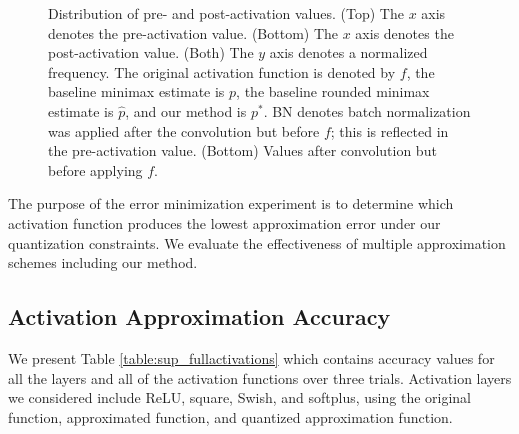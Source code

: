 \documentclass[conference]{IEEEtran}
\begin{document}
\begin{figure}[t]
{        \label{fig:hist_no_bn_fc1}
    }
    \caption{Distribution of pre- and post-activation values. (Top) The $x$ axis denotes the pre-activation value. (Bottom) The $x$ axis denotes the post-activation value. (Both) The $y$ axis denotes a normalized frequency. The original activation function is denoted by $f$, the baseline minimax estimate is $p$, the baseline rounded minimax estimate is $\hat{p}$, and our method is $p^*$. BN denotes batch normalization was applied after the convolution but before $f$; this is reflected in the pre-activation value. (Bottom) Values after convolution but before applying $f$.}
    \label{fig:hist}
\end{figure}

The purpose of the error minimization experiment is to determine which activation function produces the lowest approximation error under our quantization constraints.
We evaluate the effectiveness of multiple approximation schemes including our method.

\subsection{Activation Approximation Accuracy}
We present Table \ref{table:sup_fullactivations} which contains accuracy values for all the layers and all of the activation functions over three trials.
Activation layers we considered include ReLU, square, Swish, and softplus, using the original function, approximated function, and quantized approximation function. 
\end{document}
